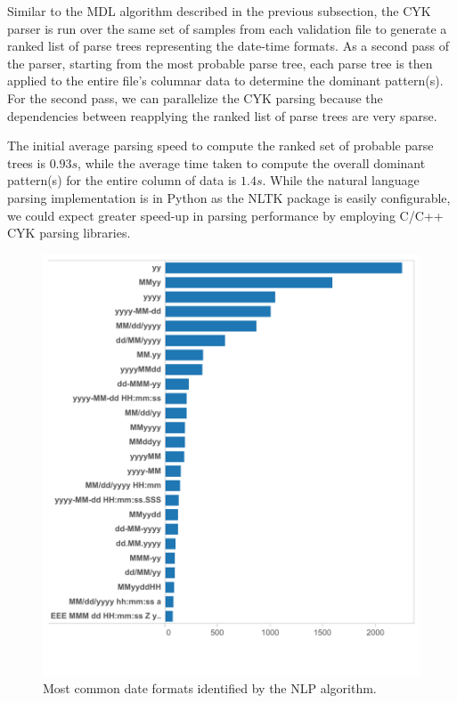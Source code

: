 Similar to the MDL algorithm described in the previous subsection, the CYK parser is run over the same set of samples from each validation file to generate a ranked list of parse trees representing the date-time formats. As a second pass of the parser, starting from the most probable parse tree, each parse tree is then applied to the entire file's columnar data to determine the dominant pattern(s). For the second pass, we can parallelize the CYK parsing because the dependencies between reapplying the ranked list of parse trees are very sparse.

The initial average parsing speed to compute the ranked set of probable parse trees is $0.93s$, while the average time taken to compute the overall dominant pattern(s) for the entire column of data is $1.4s$. While the natural language parsing implementation is in Python as the NLTK package is easily configurable, we could expect greater speed-up in parsing performance by employing C/C++ CYK parsing libraries.

\begin{figure}[ht]
\centering
\includegraphics[width=\columnwidth]{figures/FigureNLP1}
\caption{Most common date formats identified by the NLP algorithm.}
\label{fig:NLP1}
\end{figure}



